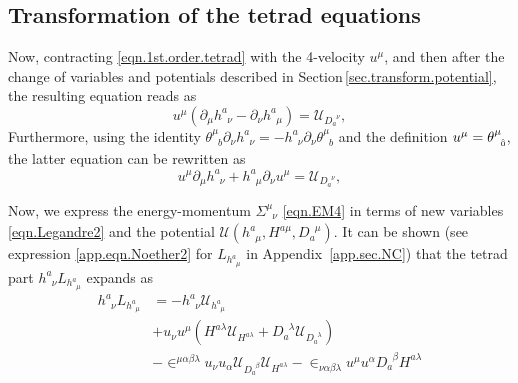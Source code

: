 \documentclass[
10pt, %
a4paper, %
oneside, %
headinclude,footinclude, %
BCOR5mm, %
]{scrartcl}
\newcommand{\tetrsymbol}{h}
\newcommand{\itetrsymbol}{\theta}
\newcommand{\itetr}[2]{\itetrsymbol^{#1}_{\phantom{#1}#2}}
\newcommand{\tetr}[2]{\tetrsymbol^{#1}_{\phantom{#1}#2}}
\newcommand{\D}[1]{\partial_{#1}} %
\newcommand{\Tors}[2]{T^{#1}_{\phantom{a}#2}}
\newcommand{\eT}[2]{D_{#1}^{\phantom{#1}#2}}	%
\newcommand{\hT}[2]{H^{#1#2}}	%
\newcommand{\Laghodge}{L}%
\newcommand{\LagST}{\mathcal{U}}%
\newcommand{\EM}[2]{\Sigma^{#1}_{\phantom{#1}#2}}
\newcommand{\LCsymb}{\bm{\in}}    %
\newcommand{\indlat}[1]{\hat{\mathsmaller{#1}}}
\begin{document}
\subsection{Transformation of the tetrad equations}

%
%


Now, contracting \eqref{eqn.1st.order.tetrad} with the 4-velocity $ u^\mu $, and then after the 
change of variables and potentials described in Section\,\ref{sec.transform.potential}, the 
resulting equation reads as
\begin{equation}
	u^\mu(\D{\mu}\tetr{a}{\nu} - \D{\nu}\tetr{a}{\mu}) = \LagST_{\eT{a}{\nu}},
\end{equation}
Furthermore, using the identity $ \itetr{\mu}{b}\D{\nu}\tetr{a}{\nu} = - 
\tetr{a}{\nu}\D{\nu}\itetr{\mu}{b}$ and the definition $ u^\mu = \itetr{\mu}{\indlat{0}} 
$, the 
latter equation can be rewritten as
\begin{equation}
	u^\mu\D{\mu}\tetr{a}{\nu} + \tetr{a}{\mu}\D{\nu}u^\mu = \LagST_{\eT{a}{\nu}},
\end{equation}

Now, we express the energy-momentum $ \EM{\mu}{\nu} $ \eqref{eqn.EM4} in terms of new variables 
\eqref{eqn.Legandre2} and 
the potential $ \LagST(\tetr{a}{\mu},\hT{a}{\mu},\eT{a}{\mu}) $. It can be shown (see 
expression \eqref{app.eqn.Noether2} 
for $ \Laghodge_{\tetr{a}{\mu}} $ in 
Appendix~\ref{app.sec.NC}) that the tetrad part $ 
\tetr{a}{\nu}\Laghodge_{\tetr{a}{\mu}} $ expands as
\begin{align}
	\tetr{a}{\nu}\Laghodge_{\tetr{a}{\mu}} & =
    -\tetr{a}{\nu} \LagST_{\tetr{a}{\mu}} \nonumber\\
   & + u_\nu u^\mu(\hT{a}{\lambda} \LagST_{\hT{a}{\lambda}} + \eT{a}{\lambda} 
   \LagST_{\eT{a}{\lambda}}) 
   \nonumber\\
   &-\LCsymb^{\mu\alpha\beta\lambda} u_\nu u_\alpha \LagST_{\eT{a}{\beta}} \LagST_{\hT{a}{\lambda}}
   -\LCsymb_{\nu\alpha\beta\lambda} u^\mu u^\alpha \eT{a}{\beta}\hT{a}{\lambda}
\end{align}
\end{document}
